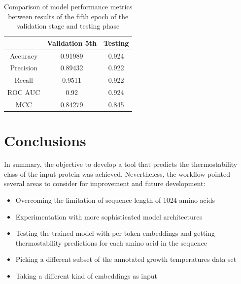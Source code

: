 \documentclass[12pt]{article}
\begin{document}
	\begin{table}[h!]
		\caption{Comparison of model performance metrics between 
		results of the fifth epoch of the validation stage and 
		testing phase}
		\vspace{0.2cm}
		\centering
		\begin{tabular}{ | c c c | }
			\hline 
			& Validation 5th & Testing \\
			\hline
			Accuracy & 0.91989 & 0.924 \\
			Precision & 0.89432 & 0.922 \\
			Recall & 0.9511 & 0.922 \\
			ROC AUC & 0.92 & 0.924 \\
			MCC & 0.84279 & 0.845 \\
			\hline 
		\end{tabular}
		\label{table:SLP003metricsTesting}
	\end{table}

	\newpage

	\section{Conclusions}

	In summary, the objective to develop a tool that predicts the thermostability
	class of the input protein was achieved. Nevertheless, the workflow pointed
	several areas to consider for improvement and future development:

	\begin{itemize}
		\item Overcoming the limitation of sequence length of 1024 amino acids
		\item Experimentation with more sophisticated model architectures
		\item Testing the trained model with per token embeddings and getting 
			  thermostability predictions for each amino acid in the sequence
		\item Picking a different subset of the annotated growth temperatures 
			  data set  
		\item Taking a different kind of embeddings as input
	\end{itemize}

	\newpage
	
	\nocite{*}
	
	\normalsize

 

\end{document}
